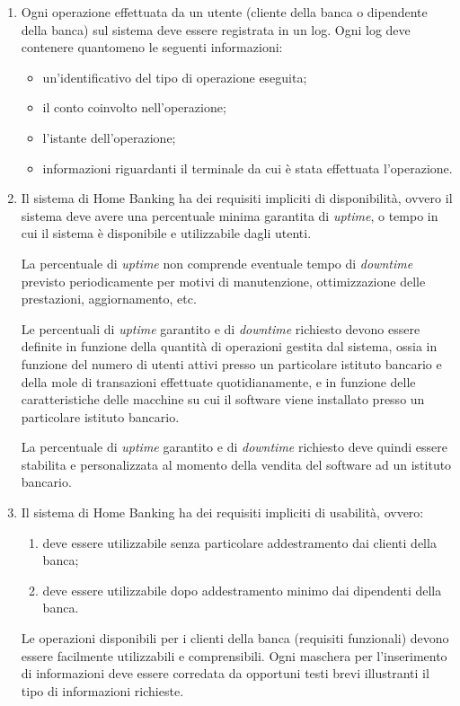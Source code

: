 \begin{enumerate}
	\item Ogni operazione effettuata da un utente (cliente della banca o dipendente della banca) sul sistema deve essere registrata in un log.
	Ogni log deve contenere quantomeno le seguenti informazioni:
	\begin{itemize}
		\item un'identificativo del tipo di operazione eseguita;
		\item il conto coinvolto nell'operazione;
		\item l'istante dell'operazione;
		\item informazioni riguardanti il terminale da cui \`e stata effettuata l'operazione.
	\end{itemize}

	\item Il sistema di Home Banking ha dei requisiti impliciti di disponibilit\`a, ovvero il sistema deve avere una percentuale minima garantita di \emph{uptime}, o tempo in cui il sistema \`e disponibile e utilizzabile dagli utenti.

	La percentuale di \emph{uptime} non comprende eventuale tempo di \emph{downtime} previsto periodicamente per motivi di manutenzione, ottimizzazione delle prestazioni, aggiornamento, etc.

	Le percentuali di \emph{uptime} garantito e di \emph{downtime} richiesto devono essere definite in funzione della quantit\`a di operazioni gestita dal sistema, ossia in funzione del numero di utenti attivi presso un particolare istituto bancario e della mole di transazioni effettuate quotidianamente, e in funzione delle caratteristiche delle macchine su cui il software viene installato presso un particolare istituto bancario.

	La percentuale di \emph{uptime} garantito e di \emph{downtime} richiesto deve quindi essere stabilita e personalizzata al momento della vendita del software ad un istituto bancario.

	\item Il sistema di Home Banking ha dei requisiti impliciti di usabilit\`a, ovvero:
	\begin{enumerate}
		\item deve essere utilizzabile senza particolare addestramento dai clienti della banca;
		\item deve essere utilizzabile dopo addestramento minimo dai dipendenti della banca.
	\end{enumerate}
	Le operazioni disponibili per i clienti della banca (requisiti funzionali) devono essere facilmente utilizzabili e comprensibili.
	Ogni maschera per l'inserimento di informazioni deve essere corredata da opportuni testi brevi illustranti il tipo di informazioni richieste.
\end{enumerate}

